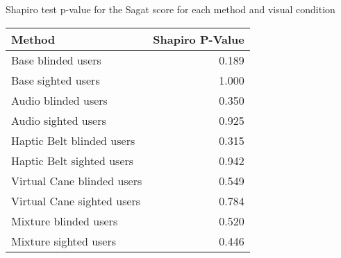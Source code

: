 
\centering
\caption{Shapiro test p-value for the Sagat score for each method and visual condition}
\label{tab:shapiro_sagat_score}
\begin{tabular}{lr}
\toprule
                    Method &  Shapiro P-Value \\
\midrule
        Base blinded users &            0.189 \\
        Base sighted users &            1.000 \\
       Audio blinded users &            0.350 \\
       Audio sighted users &            0.925 \\
 Haptic Belt blinded users &            0.315 \\
 Haptic Belt sighted users &            0.942 \\
Virtual Cane blinded users &            0.549 \\
Virtual Cane sighted users &            0.784 \\
     Mixture blinded users &            0.520 \\
     Mixture sighted users &            0.446 \\
\bottomrule
\end{tabular}
